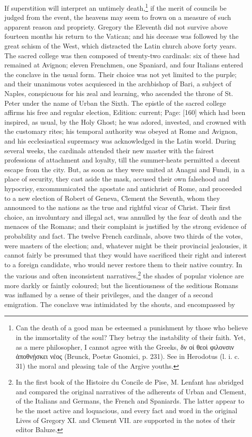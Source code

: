 If superstition will interpret an untimely death,\footnote{Can the death of a good man be esteemed a punishment by those who believe in the immortality of the soul? They betray the instability of their faith. Yet, as a mere philosopher, I cannot agree with the Greeks, \textgreek{δν οί θεο\texthebrew{ὶ} φιλονσιν \texthebrew{ἀ}ποθν\texthebrew{ῄ}σκει νέος} (Brunck, Poetæ Gnomici, p. 231). See in Herodotus (l. i. c. 31) the moral and pleasing tale of the Argive youths.} if the merit of councils be judged from the event, the heavens may seem to frown on a measure of such apparent reason and propriety. Gregory the Eleventh did not survive above fourteen months his return to the Vatican; and his decease was followed by the great schism of the West, which distracted the Latin church above forty years. The sacred college was then composed of twenty-two cardinals: six of these had remained at Avignon; eleven Frenchmen, one Spaniard, and four Italians entered the conclave in the usual form. Their choice was not yet limited to the purple; and their unanimous votes acquiesced in the archbishop of Bari, a subject of Naples, conspicuous for his zeal and learning, who ascended the throne of St. Peter under the name of Urban the Sixth. The epistle of the sacred college affirms his free and regular election, Edition: current; Page: [160] which had been inspired, as usual, by the Holy Ghost; he was adored, invested, and crowned with the customary rites; his temporal authority was obeyed at Rome and Avignon, and his ecclesiastical supremacy was acknowledged in the Latin world. During several weeks, the cardinals attended their new master with the fairest professions of attachment and loyalty, till the summer-heats permitted a decent escape from the city. But, as soon as they were united at Anagni and Fundi, in a place of security, they cast aside the mask, accused their own falsehood and hypocrisy, excommunicated the apostate and antichrist of Rome, and proceeded to a new election of Robert of Geneva, Clement the Seventh, whom they announced to the nations as the true and rightful vicar of Christ. Their first choice, an involuntary and illegal act, was annulled by the fear of death and the menaces of the Romans; and their complaint is justified by the strong evidence of probability and fact. The twelve French cardinals, above two thirds of the votes, were masters of the election; and, whatever might be their provincial jealousies, it cannot fairly be presumed that they would have sacrificed their right and interest to a foreign candidate, who would never restore them to their native country. In the various and often inconsistent narratives,\footnote{In the first book of the Histoire du Concile de Pise, M. Lenfant has abridged and compared the original narratives of the adherents of Urban and Clement, of the Italians and Germans, the French and Spaniards. The latter appear to be the most active and loquacious, and every fact and word in the original Lives of Gregory XI. and Clement VII. are supported in the notes of their editor Baluze.} the shades of popular violence are more darkly or faintly coloured; but the licentiousness of the seditious Romans was inflamed by a sense of their privileges, and the danger of a second emigration. The conclave was intimidated by the shouts, and encompassed by 